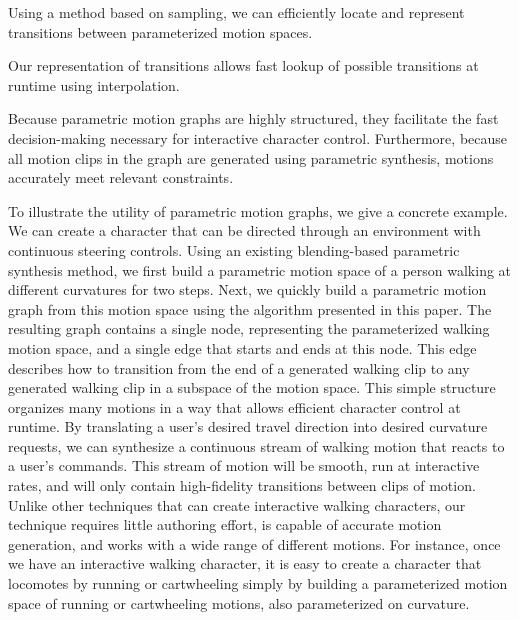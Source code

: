 \documentclass[10pt,twocolumn]{article}
\begin{document}
\begin{description}[leftmargin=0pt]
\item[Build Parametric Motion Graphs:] Using a method based on sampling, we can efficiently locate and represent transitions between parameterized motion spaces.
\item[Extract Data from Parametric Motion Graphs:] Our representation of transitions allows fast lookup of possible transitions at runtime using interpolation.
\item[Use Parametric Motion Graphs for Interactive Control:] Because parametric motion graphs are highly structured, they facilitate the fast decision-making necessary for interactive character control. Furthermore, because all motion clips in the graph are generated using parametric synthesis, motions accurately meet relevant constraints.
\end{description}

To illustrate the utility of parametric motion graphs, we give a concrete example. We can create a character that can be directed through an environment with continuous steering controls. Using an existing blending-based parametric synthesis method, we first build a parametric motion space of a person walking at different curvatures for two steps. Next, we quickly build a parametric motion graph from this motion space using the algorithm presented in this paper. The resulting graph contains a single node, representing the parameterized walking motion space, and a single edge that starts and ends at this node. This edge describes how to transition from the end of a generated walking clip to any generated walking clip in a subspace of the motion space. This simple structure organizes many motions in a way that allows efficient character control at runtime. By translating a user's desired travel direction into desired curvature requests, we can synthesize a continuous stream of walking motion that reacts to a user's commands. This stream of motion will be smooth, run at interactive rates, and will only contain high-fidelity transitions between clips of motion. Unlike other techniques that can create interactive walking characters, our technique requires little authoring effort, is capable of accurate motion generation, and works with a wide range of different motions. For instance, once we have an interactive walking character, it is easy to create a character that locomotes by running or cartwheeling simply by building a parameterized motion space of running or cartwheeling motions, also parameterized on curvature.
\end{document}
